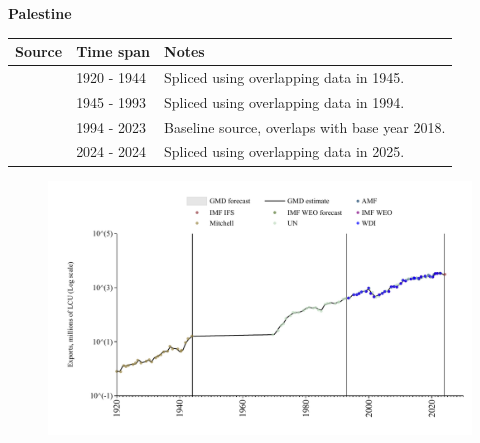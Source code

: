 \documentclass[12pt,a4paper,landscape]{article}
\begin{document}
\begin{adjustbox}{max totalsize={\paperwidth}{\paperheight},center}
\begin{minipage}[t][\textheight][t]{\textwidth}
\vspace*{0.5cm}
{}
\begin{center}
{\Large\bfseries Palestine}
\end{center}
\vspace{0.5cm}
\begin{table}[H]
\centering
\small
\begin{tabular}{|l|l|l|}
\hline
\textbf{Source} & \textbf{Time span} & \textbf{Notes} \\
\hline
\rowcolor{white}\cite{Mitchell}& 1920 - 1944 &Spliced using overlapping data in 1945.\\
\rowcolor{lightgray}\cite{UN}& 1945 - 1993 &Spliced using overlapping data in 1994.\\
\rowcolor{white}\cite{WDI}& 1994 - 2023 &Baseline source, overlaps with base year 2018.\\
\rowcolor{lightgray}\cite{IMF_IFS}& 2024 - 2024 &Spliced using overlapping data in 2025.\\
\hline
\end{tabular}
\end{table}
\begin{figure}[H]
\centering
\includegraphics[width=\textwidth,height=0.6\textheight,keepaspectratio]{graphs/PSE_exports.pdf}
\end{figure}
\end{minipage}
\end{adjustbox}
\end{document}
